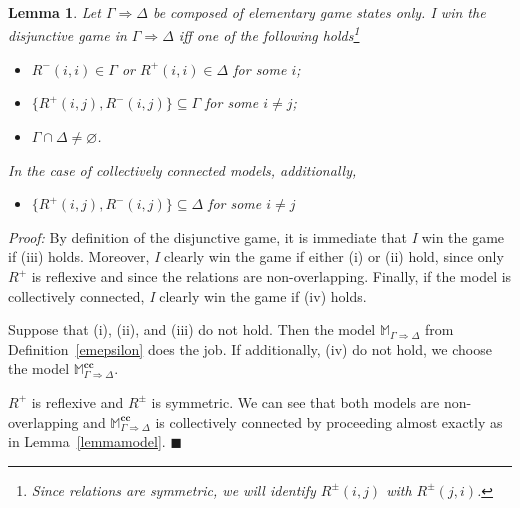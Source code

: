 \documentclass{easychair}
\newcommand{\I}{\emph{I}\xspace}
\newcommand{\You}{\emph{You}\xspace}
\renewcommand{\emptyset}{\varnothing}
\newcommand{\seq}{\Rightarrow}
\newcommand{\M}{\mathbb{M}}
\newcommand{\R}{\mathsf{R}}
\newcommand{\g}{\mathsf{g}}
\renewcommand{\qed}{\hfill$\blacksquare$}
\newtheorem{lemma}{Lemma}
\renewenvironment{proof}{\noindent\textit{Proof:}\quad}{\qed}
\newcommand{\cc}{\textbf{cc}}
\begin{document}
\begin{lemma}\label{lemma:init}
    Let $\Gamma\seq \Delta$ be composed of elementary game states only. \I win the disjunctive game in $\Gamma \seq \Delta$ iff one of the following holds\footnote{\label{foot:sym}Since relations are symmetric, we will identify $R^\pm(i,j)$ with  $R^\pm(j,i)$.} 
\begin{itemize}
\item[i.] $R^-(i,i)\in\Gamma$ or $R^+(i,i)\in\Delta$ for some $i$;
\item[ii.] $\{R^+(i,j),R^-(i,j)\}\subseteq\Gamma$ for some $i\not=j$;
\item[iii.] $\Gamma\cap\Delta\not=\emptyset$.
\end{itemize}
In the case of collectively connected models, additionally, 
\begin{itemize}
\item[iv.]  $\{R^+(i,j),R^-(i,j)\}\subseteq\Delta$ for some $i\not=j$  \end{itemize}
\end{lemma}
\begin{proof}
By definition of the disjunctive game, it is immediate that \I win the game if (iii) holds. Moreover,
\I clearly win the game if either (i) or (ii) hold, since only $R^+$ is
reflexive and since the relations are non-overlapping. Finally, if the model is collectively connected, \I clearly win the game if (iv) holds.

Suppose that (i), (ii), and (iii) do not hold. Then the model $\M_{\Gamma \Rightarrow \Delta}$ from Definition~\ref{emepsilon} does the job. If additionally, (iv) do not hold, we choose the model $\M_{\Gamma \Rightarrow \Delta}^\cc$.

$R^+$ is reflexive and $R^\pm$ is symmetric. We can see that both models are non-overlapping and $\M^\cc_{\Gamma \Rightarrow \Delta}$ is collectively connected by proceeding almost exactly as in Lemma~\ref{lemmamodel}.
\end{proof}

\begin{comment}
Observe that the models are 
\begin{itemize}
\item [-] non overlapping: if $(\g(i),\g(j))\in \R^{\pm}$, thus by definition if $R^\pm(i,j)\in \Gamma$, then by 
$\neg$(ii) $R^\mp(i,j)\notin \Gamma$, hence $(\g(i),\g(j))\notin \R^{\mp}$.
\item[-] $\R^-$"-irreflexivity: $\neg$(i) implies that $(\g(i),\g(i))\notin \R^{-}$;
\item[-] in the case of collectively connectedness, we complete $\mathbb{M}$ as follows: for all $R^\pm(i,j)\in\Delta$, 
add $(\g(i),\g(j))\in \R^{\mp}$; and for all remaining nominals $k,l$ appearing in $\Gamma\seq\Delta$ such that $R^\pm(k,l)\notin \Gamma,\Delta$, add $(\g(k),\g(l))\in \R^{+}$. Observe that $\neg(iii)$ plus 
 $\neg$(iv) guarantee the non-overlapping. 
\end{itemize}
In both cases, the defined models are such that  \You win in $g$ over $\M$, whenever $g\in D$.
\end{comment}
\end{document}
